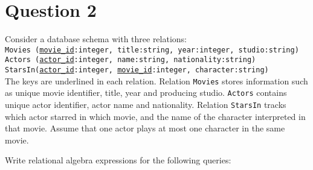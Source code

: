 
\section*{Question 2}

Consider a database schema with three relations:\\

\texttt{Movies (\underline{movie\_id}:integer, title:string, year:integer, studio:string)}\\
\texttt{Actors (\underline{actor\_id}:integer, name:string, nationality:string)}\\
\texttt{StarsIn(\underline{actor\_id}:integer, \underline{movie\_id}:integer, character:string)}\\

The keys are underlined in each relation. Relation \texttt{Movies} stores information such as unique movie identifier, title, year and  producing studio. \texttt{Actors} contains unique actor identifier, actor name and nationality. Relation \texttt{StarsIn} tracks which actor starred in which movie, and the name of the character interpreted in that movie. Assume that one actor plays at most one character in the  same movie.

Write relational algebra expressions for the following queries:


